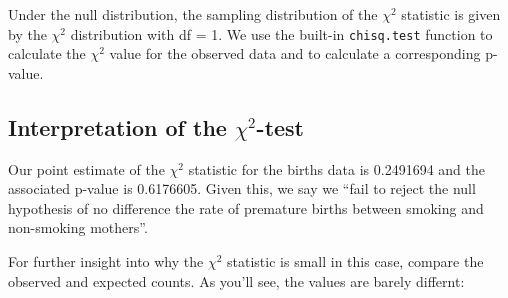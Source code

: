 \documentclass[]{book}
\newenvironment{Shaded}{\begin{snugshade}}{\end{snugshade}}
\newcommand{\CommentTok}[1]{\textcolor[rgb]{0.56,0.35,0.01}{\textit{#1}}}
\newcommand{\DataTypeTok}[1]{\textcolor[rgb]{0.13,0.29,0.53}{#1}}
\newcommand{\KeywordTok}[1]{\textcolor[rgb]{0.13,0.29,0.53}{\textbf{#1}}}
\newcommand{\NormalTok}[1]{#1}
\newcommand{\OperatorTok}[1]{\textcolor[rgb]{0.81,0.36,0.00}{\textbf{#1}}}
\newcommand{\OtherTok}[1]{\textcolor[rgb]{0.56,0.35,0.01}{#1}}
\newcommand{\StringTok}[1]{\textcolor[rgb]{0.31,0.60,0.02}{#1}}
\theoremstyle{definition}
\theoremstyle{definition}
\theoremstyle{definition}
\theoremstyle{remark}
\begin{document}
Under the null distribution, the sampling distribution of the \(\chi^2\)
statistic is given by the \(\chi^2\) distribution with df = 1. We use
the built-in \texttt{chisq.test} function to calculate the \(\chi^2\)
value for the observed data and to calculate a corresponding p-value.

\begin{Shaded}
\end{Shaded}

\hypertarget{interpretation-of-the-chi2-test}{%
\subsection{\texorpdfstring{Interpretation of the
\(\chi^2\)-test}{Interpretation of the \textbackslash{}chi\^{}2-test}}\label{interpretation-of-the-chi2-test}}

Our point estimate of the \(\chi^2\) statistic for the births data is
0.2491694 and the associated p-value is 0.6176605. Given this, we say we
``fail to reject the null hypothesis of no difference the rate of
premature births between smoking and non-smoking mothers''.

For further insight into why the \(\chi^2\) statistic is small in this
case, compare the observed and expected counts. As you'll see, the
values are barely differnt:

\begin{Shaded}
\end{Shaded}
\end{document}
